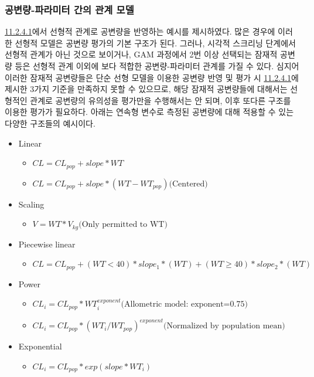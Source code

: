\documentclass[
  10pt,
  krantz2,
  a4paper]{krantz}
\providecommand{\tightlist}{%
  \setlength{\itemsep}{0pt}\setlength{\parskip}{0pt}}
\theoremstyle{definition}
\theoremstyle{definition}
\theoremstyle{definition}
\theoremstyle{remark}
\begin{document}
\hypertarget{cov-param}{%
\subsubsection{공변량-파라미터 간의 관계 모델}\label{cov-param}}

\protect\hyperlink{forward-sel-def}{11.2.4.1}에서 선형적 관계로 공변량을 반영하는 예시를 제시하였다. 많은 경우에 이러한 선형적 모델은 공변량 평가의 기본 구조가 된다. 그러나, 시각적 스크리닝 단계에서 선형적 관계가 아닌 것으로 보이거나, GAM 과정에서 2번 이상 선택되는 잠재적 공변량 등은 선형적 관계 이외에 보다 적합한 공변량-파라미터 관계를 가질 수 있다. 심지어 이러한 잠재적 공변량들은 단순 선형 모델을 이용한 공변량 반영 및 평가 시 \protect\hyperlink{forward-sel-def}{11.2.4.1}에 제시한 3가지 기준을 만족하지 못할 수 있으므로, 해당 잠재적 공변량들에 대해서는 선형적인 관계로 공변량의 유의성을 평가만을 수행해서는 안 되며, 이후 또다른 구조를 이용한 평가가 필요하다. 아래는 연속형 변수로 측정된 공변량에 대해 적용할 수 있는 다양한 구조들의 예시이다.

\begin{itemize}
\tightlist
\item
  Linear

  \begin{itemize}
  \tightlist
  \item
    \(CL = CL_{pop} + slope * WT\)
  \item
    \(CL = CL_{pop} + slope * (WT-WT_{pop}) \text{(Centered)}\)
  \end{itemize}
\item
  Scaling

  \begin{itemize}
  \tightlist
  \item
    \(V = WT * V_{kg} \text{(Only permitted to WT)}\)
  \end{itemize}
\item
  Piecewise linear

  \begin{itemize}
  \tightlist
  \item
    \(CL = CL_{pop} + (WT<40)*slope_1*(WT) + (WT\geq40)*slope_2*(WT)\)
  \end{itemize}
\item
  Power

  \begin{itemize}
  \tightlist
  \item
    \(CL_i = CL_{pop} * WT_i^{exponent} \text{(Allometric model: exponent=0.75)}\)
  \item
    \(CL_i = CL_{pop} * (WT_i/WT_{pop})^{exponent} \text{(Normalized by population mean)}\)
  \end{itemize}
\item
  Exponential

  \begin{itemize}
  \tightlist
  \item
    \(CL_i = CL_{pop} * exp(slope*WT_i)\)
  \end{itemize}
\end{itemize}
\end{document}
